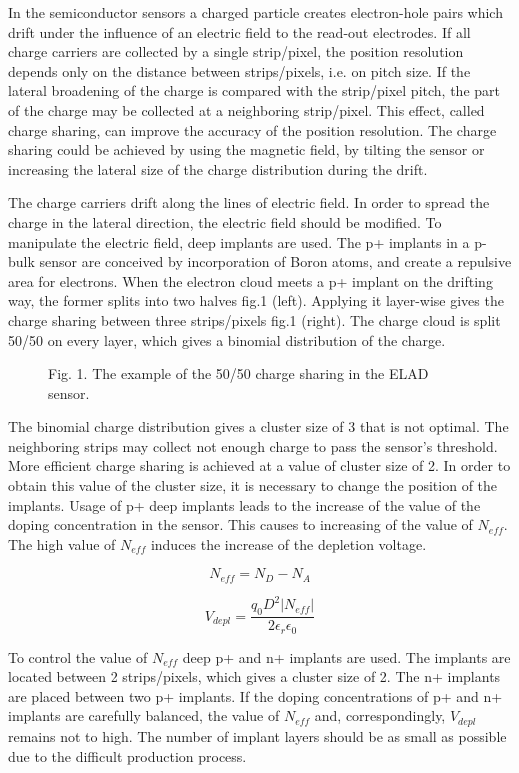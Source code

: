 
In the semiconductor sensors a charged particle creates electron-hole pairs which drift under the influence of an electric field to the read-out electrodes. If all charge carriers are collected by a single strip/pixel, the position resolution depends only on the distance between strips/pixels, i.e. on pitch size. If the lateral broadening of the charge is compared with the strip/pixel pitch, the part of the charge may be collected at a neighboring strip/pixel. This effect, called charge sharing, can improve the accuracy of the position resolution. The charge sharing could be achieved by using the magnetic field, by tilting the sensor or increasing the lateral size of the charge distribution during the drift.

The charge carriers drift along the lines of electric field. In order to spread the charge in the lateral direction, the electric field should be modified. To manipulate the electric field, deep implants are used. The p+ implants in a p-bulk sensor are conceived by incorporation of Boron atoms, and  create a repulsive area for electrons. When the electron cloud meets a p+ implant on the drifting way, the former splits into two halves fig.1 (left). Applying it layer-wise gives the charge sharing between three strips/pixels fig.1 (right).  The charge cloud is split 50/50 on every layer, which gives a binomial distribution of the charge.

\begin{figure}[h]

Fig. 1. The example of the 50/50 charge sharing in the ELAD sensor. 
\end{figure}

The binomial charge distribution gives a cluster size of 3 that is not optimal. The neighboring strips may collect not enough charge to pass the sensor's threshold. More efficient charge sharing is achieved at a value of cluster size of 2. In order to obtain this value of the cluster size, it is necessary to change the position of the implants. Usage of p+ deep implants leads to the increase of the value of the doping concentration in the sensor. This causes to increasing of the value of $N_{eff}$. The high value of $N_{eff}$ induces the increase of the depletion voltage. 

\begin{equation}
N_{eff}=N_{D}-N_{A}
\end{equation}

\begin{equation}
V_{depl}=\frac{q_0 D^2 |N_{eff}|}{2 \epsilon_r \epsilon_0 }
\end{equation}

To control the value of $N_{eff}$ deep p+ and n+ implants are used. The implants are located between 2 strips/pixels, which gives a cluster size of 2. The n+ implants are placed between two p+ implants. If the doping concentrations of p+ and n+ implants are carefully balanced, the value of $N_{eff}$ and, correspondingly, $V_{depl}$ remains not to high. The number of implant layers should be as small as possible due to the difficult production process. 
